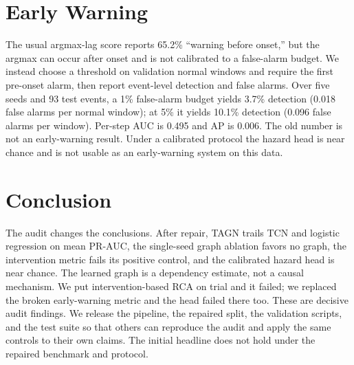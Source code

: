 \documentclass[10pt]{article}
\begin{document}
\section{Early Warning}
The usual argmax-lag score reports 65.2\% ``warning before onset,'' but the
argmax can occur after onset and is not calibrated to a false-alarm budget. We
instead choose a threshold on validation normal windows and require the first
pre-onset alarm, then report event-level detection and false alarms. Over five
seeds and 93 test events, a 1\% false-alarm budget yields 3.7\% detection
(0.018 false alarms per normal window); at 5\% it yields 10.1\% detection
(0.096 false alarms per window). Per-step AUC is 0.495 and AP is 0.006. The old
number is not an early-warning result. Under a calibrated protocol the hazard
head is near chance and is not usable as an early-warning system on this data.

\section{Conclusion}
The audit changes the conclusions. After repair, TAGN trails TCN and logistic
regression on mean PR-AUC, the single-seed graph ablation favors no graph, the intervention metric fails its positive control, and the
calibrated hazard head is near chance. The learned graph is a dependency
estimate, not a causal mechanism. We put intervention-based RCA on trial and it
failed; we replaced the broken early-warning metric and the head failed there
too. These are decisive audit findings. We release the pipeline, the repaired
split, the validation scripts, and the test suite so that others can reproduce
the audit and apply the same controls to their own claims. The initial headline
does not hold under the repaired benchmark and protocol.
\end{document}
